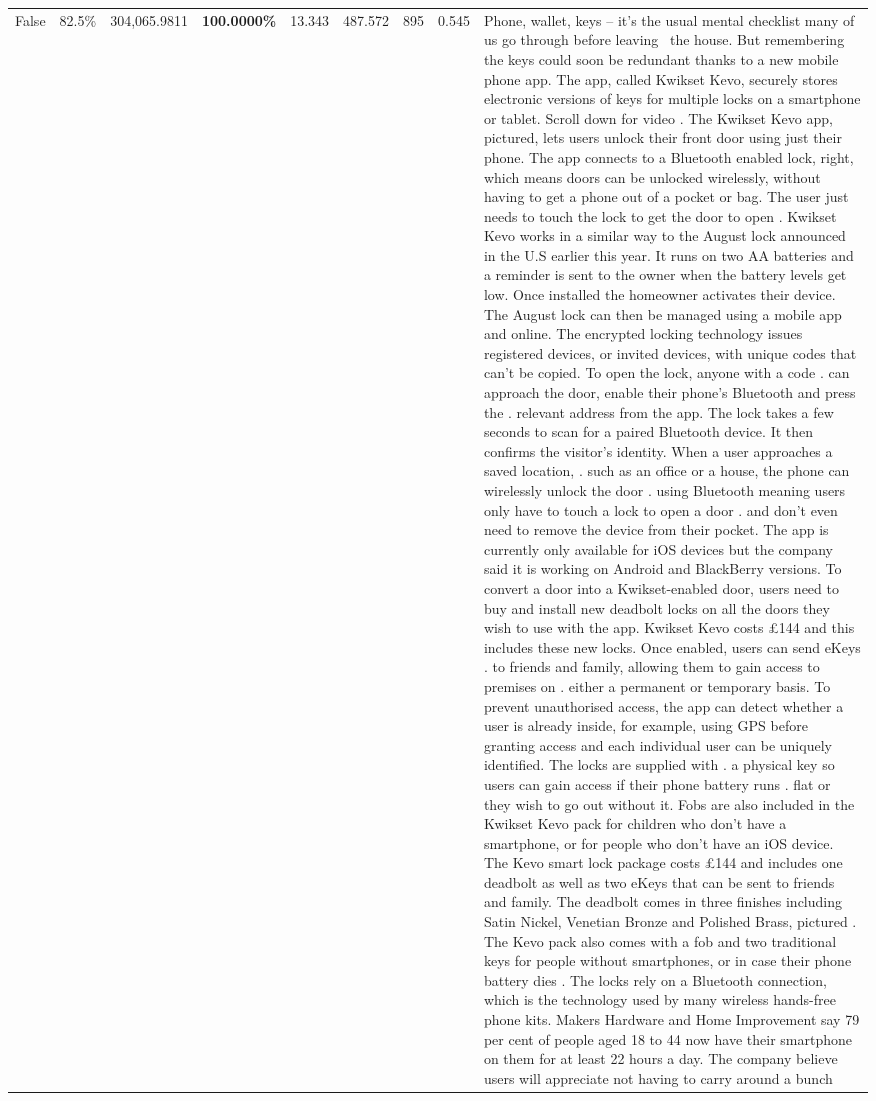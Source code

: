 \begin{table}[H]
\begin{tabular}{lllrlllll}
False & 82.5\% & 304,065.9811 & \bfseries \color{red} 100.0000\% & 13.343 & 487.572 & 895 & 0.545 & Phone, wallet, keys – it’s the usual mental checklist many of us go through before leaving  the house. But remembering the keys could soon be redundant thanks to a new mobile phone app. The app, called Kwikset Kevo, securely stores electronic versions of keys for multiple locks on a smartphone or tablet. Scroll down for video . The Kwikset Kevo app, pictured, lets users unlock their front door using just their phone. The app connects to a Bluetooth enabled lock, right, which means doors can be unlocked wirelessly, without having to get a phone out of a pocket or bag. The user just needs to touch the lock to get the door to open . Kwikset Kevo works in a similar way to the August lock announced in the U.S earlier this year. It runs on two AA batteries and a reminder is sent to the owner when the battery levels get low. Once installed the homeowner activates their device. The August lock can then be managed using a mobile app and online. The encrypted locking technology issues registered devices, or invited devices, with unique codes that can't be copied. To open the lock, anyone with a code . can approach the door, enable their phone's Bluetooth and press the . relevant address from the app. The lock takes a few seconds to scan for a paired Bluetooth device. It then confirms the visitor's identity. When a user approaches a saved location, . such as an office or a house, the phone can wirelessly unlock the door . using Bluetooth meaning users only have to touch a lock to open a door . and don't even need to remove the device from their pocket. The app is currently only available for iOS devices but the company said it is working on Android and BlackBerry versions. To convert a door into a Kwikset-enabled door, users need to buy and install new deadbolt locks on all the doors they wish to use with the app. Kwikset Kevo costs £144 and this includes these new locks. Once enabled, users can send eKeys . to friends and family, allowing them to gain access to premises on . either a permanent or temporary basis. To prevent unauthorised access, the app can detect whether a user is already inside, for example, using GPS before granting access and each individual user can be uniquely identified. The locks are supplied with . a physical key so users can gain access if their phone battery runs . flat or they wish to go out without it. Fobs are also included in the Kwikset Kevo pack for children who don't have a smartphone, or for people who don't have an iOS device. The Kevo smart lock package costs £144 and includes one deadbolt as well as two eKeys that can be sent to friends and family. The deadbolt comes in three finishes including Satin Nickel, Venetian Bronze and Polished Brass, pictured . The Kevo pack also comes with a fob and two traditional keys for people without smartphones, or in case their phone battery dies . The locks rely on a Bluetooth connection, which is the technology used by many wireless hands-free phone kits. Makers Hardware and Home Improvement say 79 per cent of people aged 18 to 44 now have their smartphone on them for at least 22 hours a day. The company believe users will appreciate not having to carry around a bunch 
\end{tabular}
\end{table}
